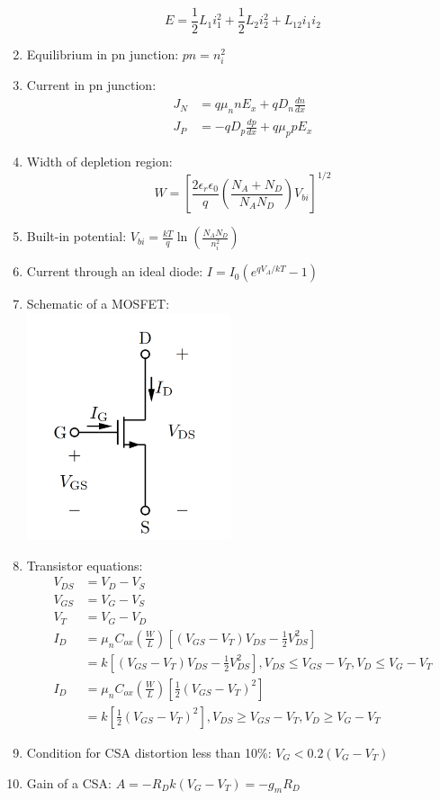 \documentclass[twocolumn]{article}
\begin{document}
\begin{enumerate}
    \[E = \frac{1}{2}L_1i_1^2 + \frac{1}{2}L_2i_2^2 + L_{12}i_1i_2\]
    \item Equilibrium in pn junction: $pn = n_i^2$
    \item Current in pn junction: 
    \begin{align*}
        J_N &= q\mu_n n E_x + qD_n \frac{dn}{dx} \\
        J_P &= -qD_p \frac{dp}{dx} + q\mu_p p E_x
    \end{align*}
    \item Width of depletion region: 
    \[W = \left[\frac{2\epsilon_r \epsilon_0}{q} \left(\frac{N_A + N_D}{N_A N_D}\right) V_{bi}\right]^{1/2}\]
    \item Built-in potential: $V_{bi} = \frac{kT}{q}\ln{\left(\frac{N_AN_D}{n_i^2}\right)}$
    \item Current through an ideal diode: $I = I_0(e^{qV_A / kT} - 1)$
    \item Schematic of a MOSFET: \\
        \includegraphics[width=6cm]{images/mosfet.png}
    \item Transistor equations: 
    \begin{align*}
        V_{DS} &= V_D -V_S\\
        V_{GS} &= V_G - V_S \\
        V_T &= V_G - V_D \\
        I_D &= \mu_n C_{ox} \left(\frac{W}{L}\right) \left[(V_{GS} - V_T)V_{DS} - \frac{1}{2} V_{DS}^2\right] \\
        &= k\left[(V_{GS} - V_T)V_{DS} - \frac{1}{2} V_{DS}^2\right], V_{DS} \leq V_{GS} - V_T, V_D \leq V_G - V_T \\
        I_D &= \mu_n C_{ox} \left(\frac{W}{L}\right) \left[\frac{1}{2} (V_{GS}-V_T)^2\right] \\
        &= k \left[\frac{1}{2} (V_{GS}-V_T)^2\right], V_{DS} \geq V_{GS} - V_T, V_D \geq V_G - V_T
    \end{align*}
    \item Condition for CSA distortion less than 10\%: $V_G < 0.2(V_G-V_T)$
    \item Gain of a CSA: $A = -R_Dk(V_G-V_T)=-g_m R_D$
\end{enumerate}
\end{document}
